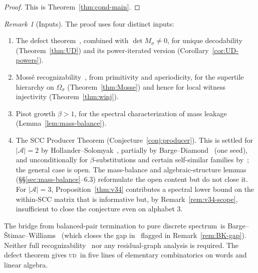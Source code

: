 \documentclass[11pt]{article}
\theoremstyle{plain}
\theoremstyle{definition}
\theoremstyle{remark}
\newtheorem{remark}[theorem]{Remark}
\newcommand{\UD}{\textsc{ud}}
\newcommand{\PDS}{pure discrete spectrum}
\newcommand{\A}{\mathcal{A}}
\begin{document}
\begin{proof}
This is Theorem~\ref{thm:cond-main}.
\end{proof}

\begin{remark}[Inputs]\label{rem:inputs}
The proof uses four distinct inputs:
\begin{enumerate}[label=(\roman*)]
\item The defect theorem~\cite{BPPR}, combined with $\det M_\sigma\ne 0$, for unique decodability (Theorem~\ref{thm:UD}) and its power-iterated version (Corollary~\ref{cor:UD-powers}).
\item Moss\'e recognizability~\cite{Mosse1,Mosse2}, from primitivity and aperiodicity, for the supertile hierarchy on $\Omega_\sigma$ (Theorem~\ref{thm:Mosse}) and hence for local witness injectivity (Theorem~\ref{thm:winj}).
\item Pisot growth $\beta>1$, for the spectral characterization of mass leakage (Lemma~\ref{lem:mass-balance}).
\item The SCC Producer Theorem (Conjecture~\ref{conj:producer}). This is settled for $|\A|=2$ by Hollander--Solomyak~\cite{HS}, partially by Barge--Diamond~\cite{BD} (one seed), and unconditionally for $\beta$-substitutions and certain self-similar families by~\cite{Barge2018,AL}; the general case is open. The mass-balance and algebraic-structure lemmas (\S\S\ref{sec:mass-balance}--6.3) reformulate the open content but do not close it. For $|\A|=3$, Proposition~\ref{thm:v34} contributes a spectral lower bound on the within-SCC matrix that is informative but, by Remark~\ref{rem:v34-scope}, insufficient to close the conjecture even on alphabet 3.
\end{enumerate}
The bridge from balanced-pair termination to \PDS\ is Barge--\v{S}timac--Williams~\cite{BSW} (which closes the gap in~\cite{BK} flagged in Remark~\ref{rem:BK-gap}). Neither full recognizability~\cite{BSTY} nor any residual-graph analysis is required. The defect theorem gives \UD\ in five lines of elementary combinatorics on words and linear algebra.
\end{remark}
\end{document}
